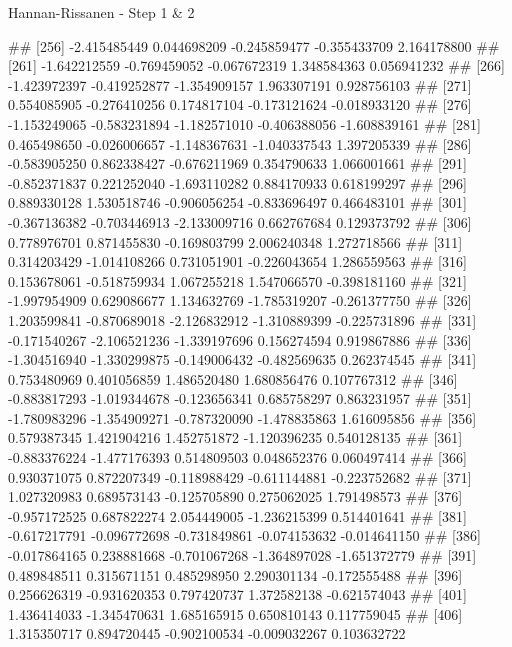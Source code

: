 \documentclass[11pt,ignorenonframetext,]{beamer}
\newenvironment{Shaded}{}{}
\newcommand{\NormalTok}[1]{#1}
\let\oldShaded\Shaded
\let\endoldShaded\endShaded
\renewenvironment{Shaded}{\footnotesize\begin{spacing}{0.9}\oldShaded}{\endoldShaded\end{spacing}}
\begin{document}
\begin{frame}[fragile,t]{Hannan-Rissanen - Step 1 \& 2}
\begin{Shaded}
\begin{Highlighting}[]
\NormalTok{## [256] -2.415485449  0.044698209 -0.245859477 -0.355433709  2.164178800}
\NormalTok{## [261] -1.642212559 -0.769459052 -0.067672319  1.348584363  0.056941232}
\NormalTok{## [266] -1.423972397 -0.419252877 -1.354909157  1.963307191  0.928756103}
\NormalTok{## [271]  0.554085905 -0.276410256  0.174817104 -0.173121624 -0.018933120}
\NormalTok{## [276] -1.153249065 -0.583231894 -1.182571010 -0.406388056 -1.608839161}
\NormalTok{## [281]  0.465498650 -0.026006657 -1.148367631 -1.040337543  1.397205339}
\NormalTok{## [286] -0.583905250  0.862338427 -0.676211969  0.354790633  1.066001661}
\NormalTok{## [291] -0.852371837  0.221252040 -1.693110282  0.884170933  0.618199297}
\NormalTok{## [296]  0.889330128  1.530518746 -0.906056254 -0.833696497  0.466483101}
\NormalTok{## [301] -0.367136382 -0.703446913 -2.133009716  0.662767684  0.129373792}
\NormalTok{## [306]  0.778976701  0.871455830 -0.169803799  2.006240348  1.272718566}
\NormalTok{## [311]  0.314203429 -1.014108266  0.731051901 -0.226043654  1.286559563}
\NormalTok{## [316]  0.153678061 -0.518759934  1.067255218  1.547066570 -0.398181160}
\NormalTok{## [321] -1.997954909  0.629086677  1.134632769 -1.785319207 -0.261377750}
\NormalTok{## [326]  1.203599841 -0.870689018 -2.126832912 -1.310889399 -0.225731896}
\NormalTok{## [331] -0.171540267 -2.106521236 -1.339197696  0.156274594  0.919867886}
\NormalTok{## [336] -1.304516940 -1.330299875 -0.149006432 -0.482569635  0.262374545}
\NormalTok{## [341]  0.753480969  0.401056859  1.486520480  1.680856476  0.107767312}
\NormalTok{## [346] -0.883817293 -1.019344678 -0.123656341  0.685758297  0.863231957}
\NormalTok{## [351] -1.780983296 -1.354909271 -0.787320090 -1.478835863  1.616095856}
\NormalTok{## [356]  0.579387345  1.421904216  1.452751872 -1.120396235  0.540128135}
\NormalTok{## [361] -0.883376224 -1.477176393  0.514809503  0.048652376  0.060497414}
\NormalTok{## [366]  0.930371075  0.872207349 -0.118988429 -0.611144881 -0.223752682}
\NormalTok{## [371]  1.027320983  0.689573143 -0.125705890  0.275062025  1.791498573}
\NormalTok{## [376] -0.957172525  0.687822274  2.054449005 -1.236215399  0.514401641}
\NormalTok{## [381] -0.617217791 -0.096772698 -0.731849861 -0.074153632 -0.014641150}
\NormalTok{## [386] -0.017864165  0.238881668 -0.701067268 -1.364897028 -1.651372779}
\NormalTok{## [391]  0.489848511  0.315671151  0.485298950  2.290301134 -0.172555488}
\NormalTok{## [396]  0.256626319 -0.931620353  0.797420737  1.372582138 -0.621574043}
\NormalTok{## [401]  1.436414033 -1.345470631  1.685165915  0.650810143  0.117759045}
\NormalTok{## [406]  1.315350717  0.894720445 -0.902100534 -0.009032267  0.103632722}

\end{Highlighting}
\end{Shaded}
\end{frame}
\end{document}
